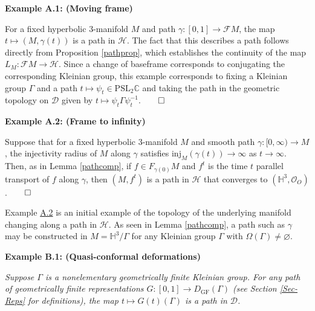 \documentclass[11pt,leqno]{article}
\DeclareMathOperator{\GF}{GF}
\theoremstyle{introdef}
\numberwithin{lemma}{section}
\theoremstyle{definition}
\newcommand{\C}{\mathbb{C}}
\begin{document}
\hypertarget{Ex-MovingFrame}{\textbf{Example A.1: (Moving frame)}}
For a fixed hyperbolic $3$-manifold $M$ and path $\gamma:[0,1]\rightarrow\mathcal{F}M$, the map $t\mapsto(M,\gamma(t))$ is a path in $\mathcal{H}$. The fact that this describes a path follows directly from Proposition \ref{pathprop}, which establishes the continuity of the map $L_M:\mathcal{F}M\rightarrow\mathcal{H}$. Since a change of baseframe corresponds to conjugating the corresponding Kleinian group, this example corresponds to fixing a Kleinian group $\Gamma$ and a path $t\mapsto\psi_t\in\mathrm{PSL}_2\C$ and taking the path 
in the geometric topology on $\mathcal{D}$ given by $t\mapsto\psi_t\Gamma\psi_t^{-1}$.$\qed$\par

\vspace{0.1in}


\hypertarget{Ex-FrameToInfty}{\textbf{Example A.2: (Frame to infinity)}} Suppose that for a fixed hyperbolic $3$-manifold $M$ and smooth path $\gamma:[0,\infty)\rightarrow M$, the injectivity radius of $M$ along $\gamma$ satisfies $\mathrm{inj}_{M}(\gamma(t))\rightarrow\infty$ as $t\rightarrow\infty$. Then, as in Lemma \ref{pathcomp}, if $f\in F_{\gamma(0)}M$ and $f^t$ is the time $t$ parallel transport of $f$ along $\gamma$, then $(M,f^t)$ is a path in $\mathcal{H}$ that converges to $(\mathbb{H}^3,\mathcal{O}_O)$.$\qed$\par

Example \hyperlink{Ex-FrameToInfty}{A.2} is an initial example of the topology of the underlying manifold changing along a path in $\mathcal{H}$. As seen in Lemma \ref{pathcomp}, a path such as $\gamma$ may be constructed in $M=\mathbb{H}^3/\Gamma$ for any Kleinian group $\Gamma$ with $\Omega(\Gamma)\neq\varnothing$.

\vspace{0.1in}


\hypertarget{Ex-QCDef}{\textbf{Example B.1: (Quasi-conformal deformations)}} \textit{Suppose $\Gamma$ is a nonelementary geometrically finite Kleinian group. For any path of geometrically finite representations $G:[0,1]\rightarrow D_{\GF}(\Gamma)$ (see Section \ref{Sec-Reps} for definitions), the map $t\mapsto G(t)(\Gamma)$ is a path in $\mathcal{D}$.}\par

\vspace{0.05in}
\end{document}
